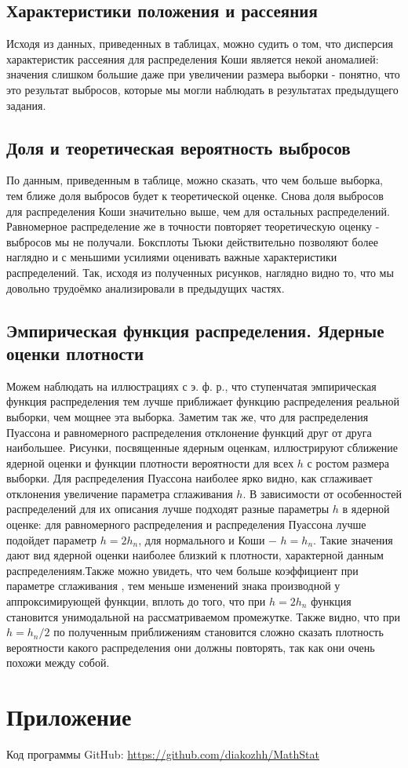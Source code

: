 \documentclass[a4paper]{article}
\begin{document}
\subsection{Характеристики положения и рассеяния}
\noindent Исходя из данных, приведенных в таблицах, можно судить о том, что дисперсия характеристик рассеяния для распределения Коши является некой аномалией: значения слишком большие даже при увеличении размера выборки - понятно, что это результат выбросов, которые мы могли наблюдать в результатах предыдущего задания.
\subsection{Доля и теоретическая вероятность выбросов}
\noindent По данным, приведенным в таблице, можно сказать, что чем больше выборка, тем ближе доля выбросов будет к теоретической оценке. Снова доля
выбросов для распределения Коши значительно выше, чем для остальных распределений. Равномерное распределение же в точности повторяет теоретическую оценку - выбросов мы не получали. \newline Боксплоты Тьюки действительно позволяют более наглядно и с меньшими усилиями оценивать важные характеристики распределений. Так, исходя из полученных рисунков, наглядно видно то, что мы довольно трудоёмко анализировали в предыдущих частях.

\subsection{Эмпирическая функция распределения. Ядерные оценки плотности}
\noindent Можем наблюдать на иллюстрациях с э. ф. р., что ступенчатая эмпирическая функция распределения тем лучше приближает функцию распределения реальной выборки, чем мощнее эта выборка. Заметим так же, что для распределения Пуассона и равномерного распределения отклонение функций друг от друга наибольшее. \newline Рисунки, посвященные ядерным оценкам, иллюстрируют сближение ядерной оценки и функции плотности вероятности для всех $h$ с ростом размера выборки. Для распределения Пуассона наиболее ярко видно, как сглаживает отклонения увеличение параметра сглаживания $h$. \newline В зависимости от особенностей распределений для их описания лучше подходят разные параметры $h$ в ядерной оценке: для равномерного распределения и распределения Пуассона лучше подойдет параметр $h = 2h_n$, для нормального и Коши − $h = h_n$. Такие значения дают вид ядерной оценки наиболее близкий к плотности, характерной данным распределениям.\newline Также можно увидеть, что чем больше коэффициент при параметре сглаживания , тем меньше изменений знака производной у аппроксимирующей функции, вплоть до того, что при $h = 2h_n$ функция становится унимодальной на рассматриваемом промежутке. Также видно, что при $h = h_n / 2$ по полученным приближениям становится сложно сказать плотность вероятности какого распределения они должны повторять, так как они очень
похожи между собой.
\section{Приложение}
\noindent Код программы GitHub: \url{https://github.com/diakozhh/MathStat}
\end{document}
